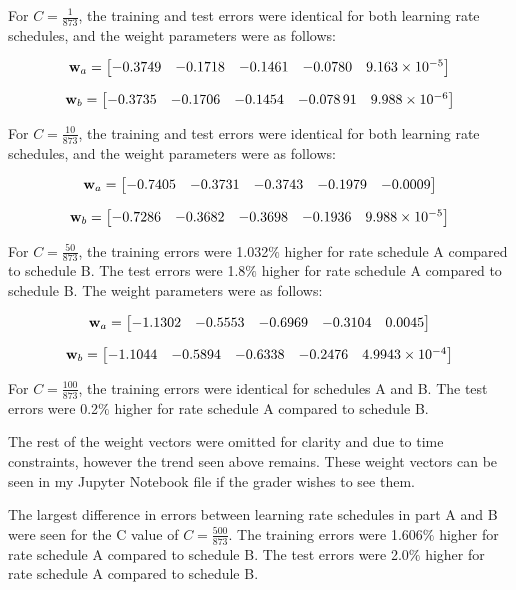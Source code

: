 \documentclass[12pt, fullpage,letterpaper]{article}
\begin{document}
\begin{enumerate}
	For $C=\frac{1}{873}$, the training and test errors were identical for both learning rate schedules, and the weight parameters were as follows:
	
	$$ {\bf w}_a = \begin{bmatrix}\num{-0.3749} & \num{-0.1718} & \num{-0.1461} & \num{-0.0780} & \num{9.163e-5}\end{bmatrix} $$
	
	$$ {\bf w}_b = \begin{bmatrix}\num{-0.3735} & \num{-0.1706} & \num{-0.1454} & \num{-0.07891} & \num{9.988e-06}\end{bmatrix} $$
	

	For $C=\frac{10}{873}$, the training and test errors were identical for both learning rate schedules, and the weight parameters were as follows:
	
	$$ {\bf w}_a = \begin{bmatrix}\num{-0.7405} & \num{-0.3731} & \num{-0.3743} & \num{-0.1979} & \num{-0.0009}\end{bmatrix} $$
	
	$$ {\bf w}_b = \begin{bmatrix}\num{-0.7286} & \num{-0.3682} & \num{-0.3698} & \num{-0.1936} & \num{9.988e-05}\end{bmatrix} $$
		
	For $C=\frac{50}{873}$, the training errors were 1.032$\%$ higher for rate schedule A compared to schedule B. The test errors were 1.8$\%$ higher for rate schedule A compared to schedule B. The weight parameters were as follows:
		
	
	$$ {\bf w}_a = \begin{bmatrix}\num{-1.1302} & \num{-0.5553} & \num{-0.6969} & \num{-0.3104} & \num{0.0045}\end{bmatrix} $$
	
	$$ {\bf w}_b = \begin{bmatrix}\num{-1.1044} & \num{-0.5894} & \num{-0.6338} & \num{-0.2476} & \num{4.9943e-04}\end{bmatrix} $$
	
	For $C=\frac{100}{873}$, the training errors were identical for schedules A and B. The test errors were 0.2$\%$ higher for rate schedule A compared to schedule B.
	
	The rest of the weight vectors were omitted for clarity and due to time constraints, however the trend seen above remains. These weight vectors can be seen in my Jupyter Notebook file if the grader wishes to see them.
	
	The largest difference in errors between learning rate schedules in part A and B were seen for the C value of $C=\frac{500}{873}$. The training errors were 1.606$\%$ higher for rate schedule A compared to schedule B. The test errors were 2.0$\%$ higher for rate schedule A compared to schedule B.
	

\end{enumerate}
\end{document}
